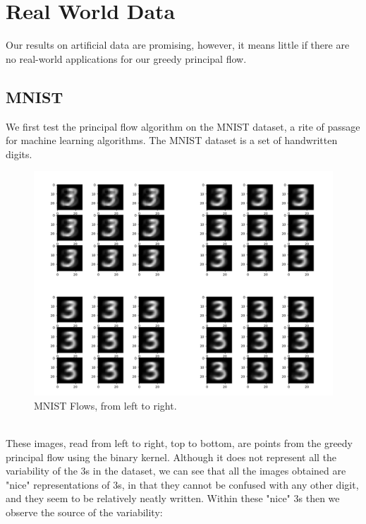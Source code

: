 \documentclass[12pt]{report}
\begin{document}
\section{Real World Data}

Our results on artificial data are promising, however, it means little
if there are no real-world applications for our greedy principal flow.

\subsection{MNIST}
 
We first test the principal flow algorithm on the MNIST dataset, a rite of passage
for machine learning algorithms. The MNIST dataset is a set of handwritten digits.\\  
\begin{figure}[ht]
    \begin{center}
        \includegraphics[scale=0.35]{main_mnist.png}
        \caption{MNIST Flows, from left to right.}
        \label{fig:mnistflows}
    \end{center}
\end{figure}\\
These images, read from left to right, top to bottom, are points from the greedy principal 
flow using the binary kernel. Although it does not represent 
all the variability of the 3s in the dataset, we can see that 
all the images obtained are "nice" representations of 3s, 
in that they cannot be confused with any other digit, and they seem to be relatively
neatly written. Within these "nice" 3s then we observe the source of the variability:
\end{document}
